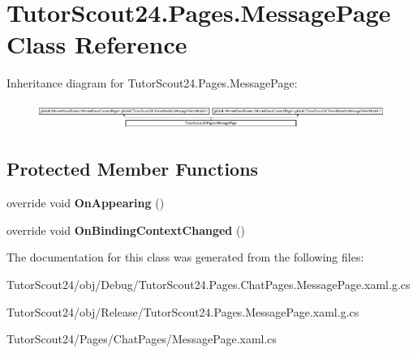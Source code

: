 \hypertarget{class_tutor_scout24_1_1_pages_1_1_message_page}{}\section{Tutor\+Scout24.\+Pages.\+Message\+Page Class Reference}
\label{class_tutor_scout24_1_1_pages_1_1_message_page}
Inheritance diagram for Tutor\+Scout24.\+Pages.\+Message\+Page\+:\begin{figure}[H]
\begin{center}
\leavevmode
\includegraphics[height=0.887480cm]{class_tutor_scout24_1_1_pages_1_1_message_page}
\end{center}
\end{figure}
\subsection*{Protected Member Functions}
\begin{DoxyCompactItemize}
\item 
\mbox{\label{class_tutor_scout24_1_1_pages_1_1_message_page_a65af4b2b1c9518a6ba8cb9fdbe760b78}} 
override void {\bfseries On\+Appearing} ()
\item 
\mbox{\label{class_tutor_scout24_1_1_pages_1_1_message_page_a424e2d9e765e955d837a2cb8f4961c49}} 
override void {\bfseries On\+Binding\+Context\+Changed} ()
\end{DoxyCompactItemize}


The documentation for this class was generated from the following files\+:\begin{DoxyCompactItemize}
\item 
Tutor\+Scout24/obj/\+Debug/Tutor\+Scout24.\+Pages.\+Chat\+Pages.\+Message\+Page.\+xaml.\+g.\+cs\item 
Tutor\+Scout24/obj/\+Release/Tutor\+Scout24.\+Pages.\+Message\+Page.\+xaml.\+g.\+cs\item 
Tutor\+Scout24/\+Pages/\+Chat\+Pages/Message\+Page.\+xaml.\+cs\end{DoxyCompactItemize}

